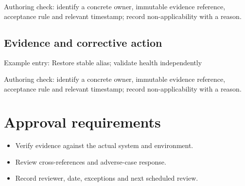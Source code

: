 \documentclass[10pt,letterpaper]{article}
\begin{document}
Authoring check: identify a concrete owner, immutable evidence reference, acceptance rule and relevant timestamp; record non-applicability with a reason.


\subsection{Evidence and corrective action}
Example entry: Restore stable alias; validate health independently

Authoring check: identify a concrete owner, immutable evidence reference, acceptance rule and relevant timestamp; record non-applicability with a reason.


\section{Approval requirements}
\begin{itemize}
\item Verify evidence against the actual system and environment.
\item Review cross-references and adverse-case response.
\item Record reviewer, date, exceptions and next scheduled review.
\end{itemize}
\end{document}
